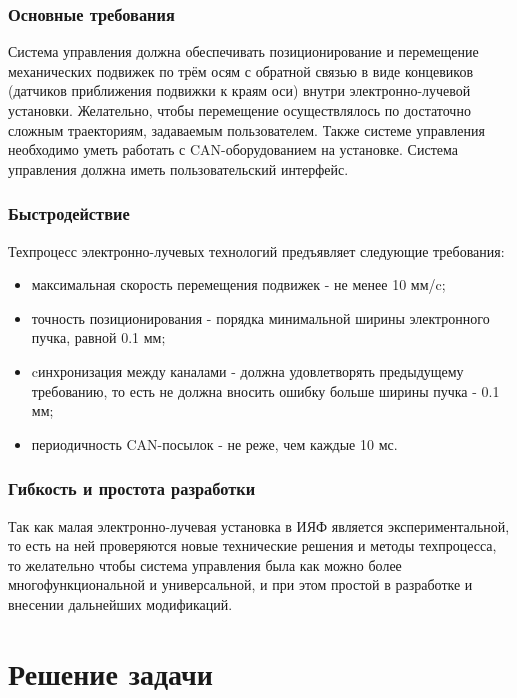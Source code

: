 \documentclass[14pt,russian,a4paper]{extarticle}
\begin{document}
\subsubsection{Основные требования}
Система управления должна обеспечивать позиционирование и перемещение механических подвижек по трём осям с обратной связью в виде концевиков (датчиков приближения подвижки к краям оси) внутри электронно-лучевой установки. Желательно, чтобы перемещение осуществлялось по достаточно сложным траекториям, задаваемым пользователем. Также системе управления необходимо уметь работать с CAN-оборудованием на установке. Система управления должна иметь пользовательский интерфейс.
\subsubsection{Быстродействие}
Техпроцесс электронно-лучевых технологий предъявляет следующие требования:
\begin{itemize}
    \item максимальная скорость перемещения подвижек - не менее 10 мм/c;
    \item точность позиционирования - порядка минимальной ширины электронного пучка, равной 0.1 мм;
    \item cинхронизация между каналами - должна удовлетворять предыдущему требованию, то есть не должна вносить ошибку больше ширины пучка - 0.1 мм;
    \item периодичность CAN-посылок - не реже, чем каждые 10 мс.
\end{itemize}
\subsubsection{Гибкость и простота разработки}
Так как малая электронно-лучевая установка в ИЯФ является экспериментальной, то есть на ней проверяются новые технические решения и методы техпроцесса, то желательно чтобы система управления была как можно более многофункциональной и универсальной, и при этом простой в разработке и внесении дальнейших модификаций.

\newpage

\section{Решение задачи}
\end{document}
